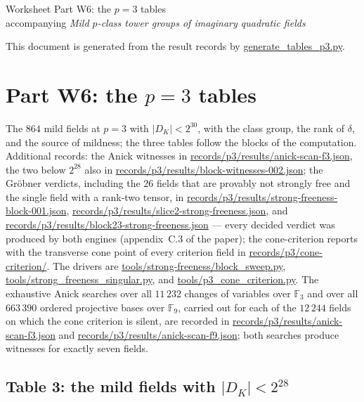 \documentclass[11pt]{article}
\newcommand{\Fnine}{\mathbb F_9}
\newcommand{\Fthree}{\mathbb F_3}
\providecommand{\nolinkurl}[1]{\url{#1}}
\begin{document}
\begin{center}
{\Large Worksheet Part W6: the $p=3$ tables}\\[2mm]
accompanying \emph{Mild $p$-class tower groups of imaginary quadratic
fields}
\end{center}

\medskip
\noindent
This document is generated from the result records by
\nolinkurl{generate_tables_p3.py}.

\section*{Part W6: the $p=3$ tables}

The $864$ mild fields at $p=3$ with $|D_K|<2^{30}$, with the class
group, the rank of $\delta$, and the source of mildness; the three
tables follow the blocks of the computation.  Additional records:
the Anick witnesses in
\nolinkurl{records/p3/results/anick-scan-f3.json}, the two
below $2^{28}$ also in
\nolinkurl{records/p3/results/block-witnesses-002.json}; the
Gr\"obner verdicts, including the $26$ fields that are provably not
strongly free and the single field with a rank-two tensor, in
\nolinkurl{records/p3/results/strong-freeness-block-001.json},
\nolinkurl{records/p3/results/slice2-strong-freeness.json}, and
\nolinkurl{records/p3/results/block23-strong-freeness.json} ---
every decided verdict was produced by both engines (appendix~C.3
of the paper); the cone-criterion
reports with the transverse cone point of every criterion field in
\nolinkurl{records/p3/cone-criterion/}.  The drivers are
\nolinkurl{tools/strong-freeness/block_sweep.py},
\nolinkurl{tools/strong_freeness_singular.py}, and
\nolinkurl{tools/p3_cone_criterion.py}.  The exhaustive Anick
searches over all $11\,232$ changes of variables over $\Fthree$
and over all $663\,390$ ordered projective bases over $\Fnine$,
carried out for each of the $12\,244$ fields on which the cone
criterion is silent, are recorded in
\nolinkurl{records/p3/results/anick-scan-f3.json} and
\nolinkurl{records/p3/results/anick-scan-f9.json}; both searches
produce witnesses for exactly seven fields.

\subsection*{Table 3: the mild fields with $|D_K|<2^{28}$}
\end{document}
